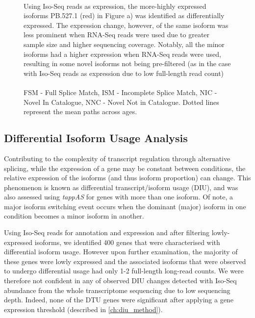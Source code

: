 \begin{figure}[!htp]
{	\\	
	Using Iso-Seq reads as expression, the more-highly expressed isoforms PB.527.1 (red) in Figure a) was identified as differentially expressed. The expression change, however, of the same isoform was less prominent when RNA-Seq reads were used due to greater sample size and higher sequencing coverage. Notably, all the minor isoforms had a higher expression when RNA-Seq reads were used, resulting in some novel isoforms not being pre-filtered (as in the case with Iso-Seq reads as expression due to low full-length read count)
	\\
	\\
	FSM - Full Splice Match, ISM - Incomplete Splice Match, NIC - Novel In Catalogue, NNC - Novel Not in Catalogue. Dotted lines represent the mean paths across ages.
}   
	\label{fig:dei_highisoexp}
\end{figure}


\clearpage
\subsection{Differential Isoform Usage Analysis}
Contributing to the complexity of transcript regulation through alternative splicing, while the expression of a gene may be constant between conditions, the relative expression of the isoforms (and thus isoform proportion) can change. This phenomenon is known as differential transcript/isoform usage (DIU), and was also assessed using \textit{tappAS} for genes with more than one isoform. Of note, a major isoform switching event occurs when the dominant (major) isoform in one condition becomes a minor isoform in another.    

Using Iso-Seq reads for annotation and expression and after filtering lowly-expressed isoforms, we identified 400 genes that were characterised with differential isoform usage. However upon further examination, the majority of these genes were lowly expressed and the associated isoforms that were observed to undergo differential usage had only 1-2 full-length long-read counts. We were therefore not confident in any of observed DIU changes detected with Iso-Seq abundance from the whole transcriptome sequencing due to low sequencing depth. Indeed, none of the DTU genes were significant after applying a gene expression threshold (described in \cref{ch:diu_method}).


